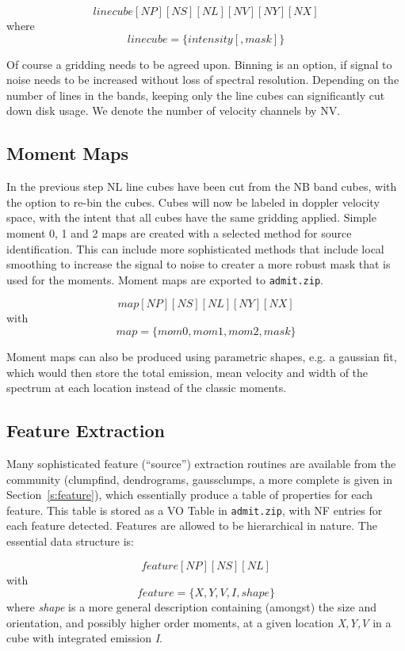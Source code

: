 \documentclass[preprint]{aastex} %
\begin{document}
$$
     linecube[NP][NS][NL][NV][NY][NX]
$$
where 
$$
     linecube = \{ intensity [, mask] \}
$$

Of course a gridding needs to be agreed upon. Binning is an option,
if signal to noise needs to be increased without loss of  
spectral resolution. Depending on the number of lines in the bands,
keeping only the line cubes can significantly cut down disk usage.
We denote the number of velocity channels by NV. 

\subsection{Moment Maps}

In the previous step NL line cubes have been cut from the NB band cubes,
with the option to re-bin the cubes.
Cubes will now be labeled in doppler velocity space, with the intent
that all cubes have the same gridding applied.  Simple moment 0, 1 and 2 maps
are created with a selected method for source identification. This can 
include more sophisticated methods that include local smoothing to
increase the signal to noise to creater a more robust mask that is used
for the moments. Moment maps are exported to {\tt admit.zip}.

$$
    map[NP][NS][NL][NY][NX]
$$
with
$$
    map = \{mom0, mom1, mom2, mask\}
$$

Moment maps can also be produced using parametric shapes, e.g. a gaussian fit, which
would then store the total emission, mean velocity and width of the spectrum at each
location instead of the classic moments.

\subsection{Feature Extraction}

Many sophisticated feature (``source'') extraction routines are available from the community
(clumpfind, dendrograms, gaussclumps, a more complete is given in Section~\ref{s:feature}),
which essentially produce
a table of properties for each feature. This table is stored as a VO Table 
in {\tt admit.zip}, with NF entries for each feature detected. Features
are allowed to be hierarchical in nature. The essential data structure is:

$$
   feature[NP][NS][NL]
$$
with
$$
   feature = \{X, Y, V, I, shape\}
$$
where {\it shape} is a more general description containing (amongst) the size
and orientation, and possibly higher order moments, at a given location
{\it X,Y,V} in a cube with integrated emission {\it I}. 
\end{document}
